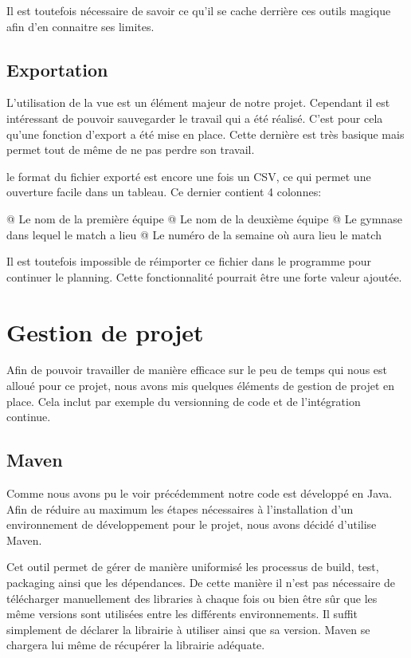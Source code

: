 \documentclass[final, noposter]{polytech/polytech}
\begin{document}
			Il est toutefois nécessaire de savoir ce qu'il se cache derrière ces outils magique afin d'en connaitre ses limites.
		
	\section{Exportation}
		L'utilisation de la vue est un élément majeur de notre projet.
		Cependant il est intéressant de pouvoir sauvegarder le travail qui a été réalisé.
		C'est pour cela qu'une fonction d'export a été mise en place.
		Cette dernière est très basique mais permet tout de même de ne pas perdre son travail.
		
		
		le format du fichier exporté est encore une fois un CSV, ce qui permet une ouverture facile dans un tableau.
		Ce dernier contient 4 colonnes:
		\begin{easylist}[itemize]
			@ Le nom de la première équipe
			@ Le nom de la deuxième équipe
			@ Le gymnase dans lequel le match a lieu
			@ Le numéro de la semaine où aura lieu le match
		\end{easylist}
	
		Il est toutefois impossible de réimporter ce fichier dans le programme pour continuer le planning.
		Cette fonctionnalité pourrait être une forte valeur ajoutée.

\chapter{Gestion de projet}
	Afin de pouvoir travailler de manière efficace sur le peu de temps qui nous est alloué pour ce projet, nous avons mis quelques éléments de gestion de projet en place.
	Cela inclut par exemple du versionning de code et de l'intégration continue.
	
	\section{Maven\label{sec:maven}}
		Comme nous avons pu le voir précédemment notre code est développé en Java.
		Afin de réduire au maximum les étapes nécessaires à l'installation d'un environnement de développement pour le projet, nous avons décidé d'utilise Maven.
		
		Cet outil permet de gérer de manière uniformisé les processus de build, test, packaging ainsi que les dépendances.
		De cette manière il n'est pas nécessaire de télécharger manuellement des libraries à chaque fois ou bien être sûr que les même versions sont utilisées entre les différents environnements.
		Il suffit simplement de déclarer la librairie à utiliser ainsi que sa version.
		Maven se chargera lui même de récupérer la librairie adéquate.
		
\end{document}
